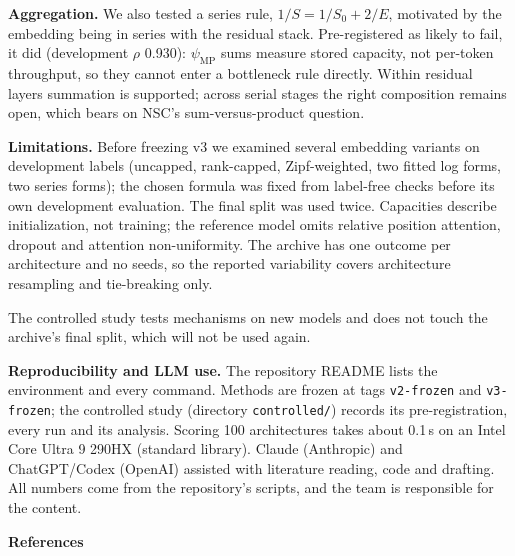 \documentclass[a4paper,12pt]{article}
\newcommand{\psimp}{\psi_{\mathrm{MP}}}
\begin{document}
\textbf{Aggregation.} We also tested a series rule, $1/S=1/S_0+2/E$, motivated by the embedding being in series with the residual stack. Pre-registered as likely to fail, it did (development $\rho$ 0.930): $\psimp$ sums measure stored capacity, not per-token throughput, so they cannot enter a bottleneck rule directly. Within residual layers summation is supported; across serial stages the right composition remains open, which bears on NSC's sum-versus-product question.

\textbf{Limitations.} Before freezing v3 we examined several embedding variants on development labels (uncapped, rank-capped, Zipf-weighted, two fitted log forms, two series forms); the chosen formula was fixed from label-free checks before its own development evaluation. The final split was used twice. Capacities describe initialization, not training; the reference model omits relative position attention, dropout and attention non-uniformity. The archive has one outcome per architecture and no seeds, so the reported variability covers architecture resampling and tie-breaking only.

The controlled study tests mechanisms on new models and does not touch the archive's final split, which will not be used again.

\textbf{Reproducibility and LLM use.} The repository README lists the environment and every command. Methods are frozen at tags \texttt{v2-frozen} and \texttt{v3-frozen}; the controlled study (directory \texttt{controlled/}) records its pre-registration, every run and its analysis. Scoring 100 architectures takes about 0.1\,s on an Intel Core Ultra 9 290HX (standard library). Claude (Anthropic) and ChatGPT/Codex (OpenAI) assisted with literature reading, code and drafting. All numbers come from the repository's scripts, and the team is responsible for the content.

\newpage
\textbf{References}
\end{document}
